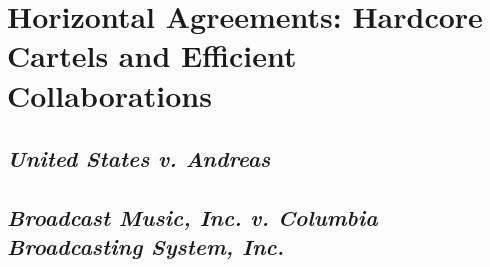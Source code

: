 \section{Horizontal Agreements: Hardcore Cartels and Efficient Collaborations}

\subsection{\emph{United States v. Andreas}}


\subsection{\emph{Broadcast Music, Inc. v. Columbia Broadcasting System, Inc.}}

